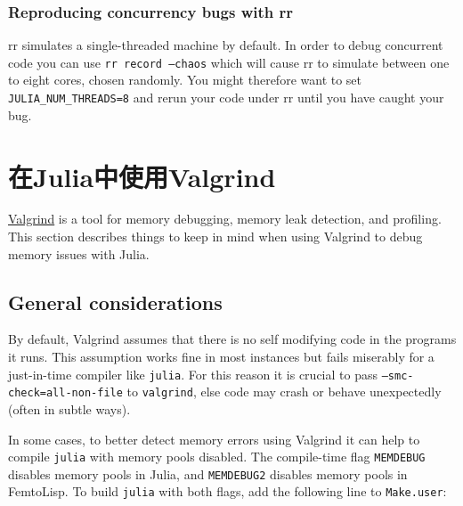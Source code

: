 \hypertarget{8199500901675456324}{}


\subsubsection{Reproducing concurrency bugs with rr}



rr simulates a single-threaded machine by default. In order to debug concurrent code you can use \texttt{rr record --chaos} which will cause rr to simulate between one to eight cores, chosen randomly. You might therefore want to set \texttt{JULIA\_NUM\_THREADS=8} and rerun your code under rr until you have caught your bug.



\hypertarget{1705795605392310931}{}


\section{在Julia中使用Valgrind}



\href{http://valgrind.org/}{Valgrind} is a tool for memory debugging, memory leak detection, and profiling.  This section describes things to keep in mind when using Valgrind to debug memory issues with Julia.



\hypertarget{527857279218691176}{}


\subsection{General considerations}



By default, Valgrind assumes that there is no self modifying code in the programs it runs.  This assumption works fine in most instances but fails miserably for a just-in-time compiler like \texttt{julia}.  For this reason it is crucial to pass \texttt{--smc-check=all-non-file} to \texttt{valgrind}, else code may crash or behave unexpectedly (often in subtle ways).



In some cases, to better detect memory errors using Valgrind it can help to compile \texttt{julia} with memory pools disabled.  The compile-time flag \texttt{MEMDEBUG} disables memory pools in Julia, and \texttt{MEMDEBUG2} disables memory pools in FemtoLisp.  To build \texttt{julia} with both flags, add the following line to \texttt{Make.user}:




